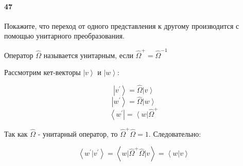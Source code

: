 


\paragraph{47}
Покажите, что переход от одного представления к другому производится с помощью унитарного преобразования.\\

\begin{definition}
Оператор $\hat{\Omega}$ называется унитарным, если $\hat{\Omega}^+=\hat{\Omega}^{-1}$
\end{definition}

Рассмотрим кет-векторы $\left|v\right>$ и $\left|w\right>$:

$$\left|v^{'}\right> = \hat{\Omega}\left|v\right>$$
$$\left|w^{'}\right> = \hat{\Omega}\left|w\right>$$
$$\left<w^{'}\right| = \left<w\right|\hat{\Omega}^{+}$$

Так как $\hat{\Omega}$ - унитарный оператор, то $\hat{\Omega}^{+}\hat{\Omega} = 1$.
Следовательно:

$$\left<w^{'}\vert v^{'}\right> = \left<w\vert\hat{\Omega}^{+}\hat{\Omega}\vert v\right> = \left<w\vert v\right>$$

